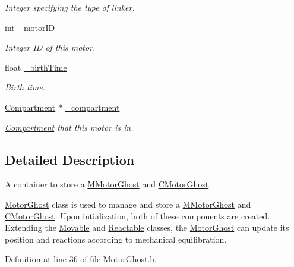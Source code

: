 \begin{DoxyCompactItemize}
\begin{DoxyCompactList}\small\item\em Integer specifying the type of linker. \end{DoxyCompactList}\item 
int \hyperlink{classMotorGhost_a8af6f4cdc0bd8ab2300b6f4bba550f1c}{\+\_\+motor\+I\+D}
\begin{DoxyCompactList}\small\item\em Integer I\+D of this motor. \end{DoxyCompactList}\item 
float \hyperlink{classMotorGhost_a7b33616ae53f08cf2095d30090a4fa82}{\+\_\+birth\+Time}
\begin{DoxyCompactList}\small\item\em Birth time. \end{DoxyCompactList}\item 
\hyperlink{classCompartment}{Compartment} $\ast$ \hyperlink{classMotorGhost_a3a16b996a9a4a7e51735b410e65d339c}{\+\_\+compartment}
\begin{DoxyCompactList}\small\item\em \hyperlink{classCompartment}{Compartment} that this motor is in. \end{DoxyCompactList}\end{DoxyCompactItemize}


\subsection{Detailed Description}
A container to store a \hyperlink{classMMotorGhost}{M\+Motor\+Ghost} and \hyperlink{classCMotorGhost}{C\+Motor\+Ghost}. 

\hyperlink{classMotorGhost}{Motor\+Ghost} class is used to manage and store a \hyperlink{classMMotorGhost}{M\+Motor\+Ghost} and \hyperlink{classCMotorGhost}{C\+Motor\+Ghost}. Upon intialization, both of these components are created. Extending the \hyperlink{classMovable}{Movable} and \hyperlink{classReactable}{Reactable} classes, the \hyperlink{classMotorGhost}{Motor\+Ghost} can update its position and reactions according to mechanical equilibration. 

Definition at line 36 of file Motor\+Ghost.\+h.



